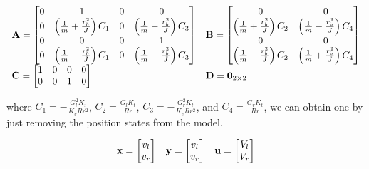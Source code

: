 \begin{equation*}
  \begin{array}{ll}
    \mathbf{A} =
    \begin{bmatrix}
      0 & 1 & 0 & 0 \\
      0 & \left(\frac{1}{m} + \frac{r_b^2}{J}\right) C_1 & 0 & \left(\frac{1}{m} - \frac{r_b^2}{J}\right) C_3 \\
      0 & 0 & 0 & 1 \\
      0 & \left(\frac{1}{m} - \frac{r_b^2}{J}\right) C_1 & 0 & \left(\frac{1}{m} + \frac{r_b^2}{J}\right) C_3
    \end{bmatrix} &
    \mathbf{B} =
    \begin{bmatrix}
      0 & 0 \\
      \left(\frac{1}{m} + \frac{r_b^2}{J}\right) C_2 & \left(\frac{1}{m} - \frac{r_b^2}{J}\right) C_4 \\
      0 & 0 \\
      \left(\frac{1}{m} - \frac{r_b^2}{J}\right) C_2 & \left(\frac{1}{m} + \frac{r_b^2}{J}\right) C_4
    \end{bmatrix} \\
    \mathbf{C} =
    \begin{bmatrix}
      1 & 0 & 0 & 0 \\
      0 & 0 & 1 & 0 \\
    \end{bmatrix} &
    \mathbf{D} = \mathbf{0}_{2 \times 2}
  \end{array}
\end{equation*}

where $C_1 = -\frac{G_l^2 K_t}{K_v R r^2}$, $C_2 = \frac{G_l K_t}{Rr}$,
$C_3 = -\frac{G_r^2 K_t}{K_v R r^2}$, and $C_4 = \frac{G_r K_t}{Rr}$, we can
obtain one by just removing the position \glspl{state} from the \gls{model}.

\begin{equation*}
  \begin{array}{ccc}
    \mathbf{x} =
    \begin{bmatrix}
      v_l \\
      v_r
    \end{bmatrix} &
    \mathbf{y} =
    \begin{bmatrix}
      v_l \\
      v_r
    \end{bmatrix} &
    \mathbf{u} =
    \begin{bmatrix}
      V_l \\
      V_r
    \end{bmatrix}
  \end{array}
\end{equation*}

